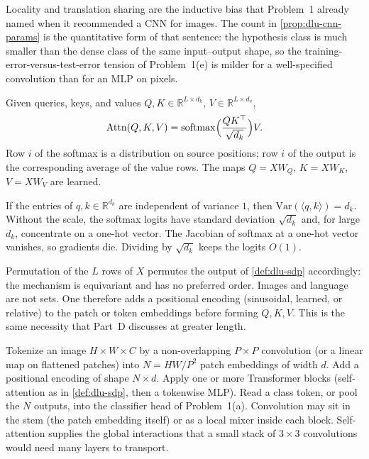 \begin{remark}
\label{rem:dlu-cnn-inductive}
Locality and translation sharing are the inductive bias that Problem~1 already named when it recommended a CNN for images. The count in \cref{prop:dlu-cnn-params} is the quantitative form of that sentence: the hypothesis class is much smaller than the dense class of the same input--output shape, so the training-error-versus-test-error tension of Problem~1(e) is milder for a well-specified convolution than for an MLP on pixels.
\end{remark}

\begin{definition}
\label{def:dlu-sdp}
Given queries, keys, and values \(Q,K\in\mathbb{R}^{L\times d_k}\), \(V\in\mathbb{R}^{L\times d_v}\),
\[
\mathrm{Attn}(Q,K,V)
=
\mathrm{softmax}\Bigl(\frac{QK^\top}{\sqrt{d_k}}\Bigr)V.
\]
Row \(i\) of the softmax is a distribution on source positions; row \(i\) of the output is the corresponding average of the value rows. The maps \(Q=XW_Q\), \(K=XW_K\), \(V=XW_V\) are learned.
\end{definition}

\begin{proposition}
\label{prop:dlu-scale}
If the entries of \(q,k\in\mathbb{R}^{d_k}\) are independent of variance \(1\), then \(\mathrm{Var}(\langle q,k\rangle)=d_k\). Without the scale, the softmax logits have standard deviation \(\sqrt{d_k}\) and, for large \(d_k\), concentrate on a one-hot vector. The Jacobian of softmax at a one-hot vector vanishes, so gradients die. Dividing by \(\sqrt{d_k}\) keeps the logits \(O(1)\).
\end{proposition}

\begin{remark}
\label{rem:dlu-pos}
Permutation of the \(L\) rows of \(X\) permutes the output of \cref{def:dlu-sdp} accordingly: the mechanism is equivariant and has no preferred order. Images and language are not sets. One therefore adds a positional encoding (sinusoidal, learned, or relative) to the patch or token embeddings before forming \(Q,K,V\). This is the same necessity that Part~D discusses at greater length.
\end{remark}

\begin{construction}
\label{con:dlu-vit}
Tokenize an image \(H\times W\times C\) by a non-overlapping \(P\times P\) convolution (or a linear map on flattened patches) into \(N=HW/P^{2}\) patch embeddings of width \(d\). Add a positional encoding of shape \(N\times d\). Apply one or more Transformer blocks (self-attention as in \cref{def:dlu-sdp}, then a tokenwise MLP). Read a class token, or pool the \(N\) outputs, into the classifier head of Problem~1(a). Convolution may sit in the stem (the patch embedding itself) or as a local mixer inside each block. Self-attention supplies the global interactions that a small stack of \(3\times 3\) convolutions would need many layers to transport.
\end{construction}

